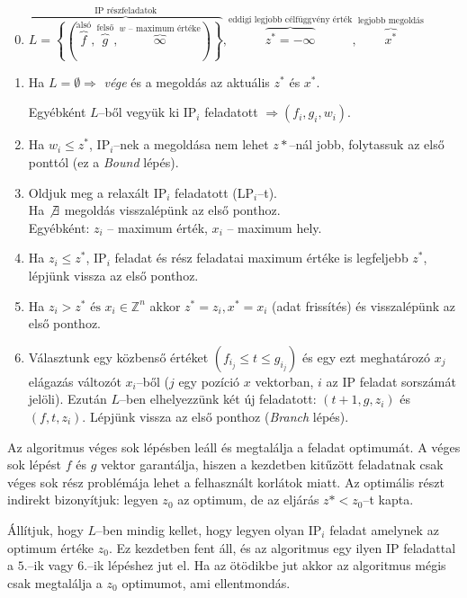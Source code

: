 \begin{enumerate}
  \setcounter{enumi}{-1}
  \item $\overbrace{L=\left\{ \left(
  \overbrace{f}^{\text{alsó}},\overbrace{g}^{\text{felső}},\overbrace{\infty}^{w
  \text{ -- maximum értéke}} \right) \right\}}^{\text{IP részfeladatok}},
  \overbrace{z^*=-\infty}^{\text{eddigi legjobb célfüggvény érték}},
  \overbrace{x^*}^{\text{legjobb megoldás}}$
  \item Ha $L=\emptyset \Rightarrow$ \emph{vége} és a megoldás az aktuális $z^*$
  és $x^*$.
  
  Egyébként $L$--ből vegyük ki IP$_i$ feladatott $\Rightarrow (f_i, g_i, w_i)$.
  \item Ha $w_i \leq z^*$, IP$_i$--nek a megoldása nem lehet $z*$--nál jobb,
  folytassuk az első ponttól (ez a \emph{Bound} lépés).
  \item Oldjuk meg a relaxált IP$_i$ feladatott (LP$_i$--t).
  \\ Ha $\not \exists$ megoldás visszalépünk az első ponthoz.
  \\ Egyébként: $z_i$ -- maximum érték,  $x_i$ -- maximum hely.
  \item Ha $z_i \leq z^*$, IP$_i$ feladat és rész feladatai maximum értéke is
  legfeljebb $z^*$, lépjünk vissza az első ponthoz.
  \item Ha $z_i > z^* \mbox{ és } x_i \in \mathbb{Z}^{n}$ akkor $ z^* = z_i, x^* =
  x_i$ (adat frissítés) és visszalépünk az első ponthoz.
  \item Választunk egy közbenső értéket $(f_{i_j} \leq t \leq g_{i_j})$ és egy
  ezt meghatározó $x_j$ elágazás változót $x_i$--ből ($j$ egy pozíció $x$
  vektorban, $i$ az IP feladat sorszámát jelöli). Ezután $L$--ben elhelyezzünk
  két új feladatott:  $(t+1, g, z_i)$ és $(f, t, z_i)$. Lépjünk vissza az első
  ponthoz (\emph{Branch} lépés).
\end{enumerate} 

Az algoritmus véges sok lépésben leáll és megtalálja a feladat optimumát. A
véges sok lépést $f$ és $g$ vektor garantálja, hiszen a kezdetben kitűzött
feladatnak csak véges sok rész problémája lehet a felhasznált korlátok miatt. Az
optimális részt indirekt bizonyítjuk: legyen $z_0$ az optimum, de az eljárás
$z*<z_0$--t kapta.

Állítjuk, hogy $L$--ben mindig kellet, hogy legyen olyan IP$_i$ feladat amelynek
az optimum értéke $z_0$. Ez kezdetben fent áll, és az algoritmus egy ilyen IP
feladattal a $5.$--ik vagy $6.$--ik lépéshez jut el. Ha az ötödikbe jut akkor az
algoritmus mégis csak megtalálja a $z_0$ optimumot, ami ellentmondás.

